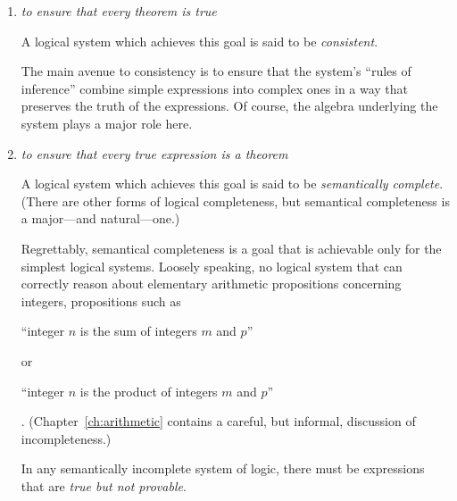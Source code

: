 \begin{enumerate}
\item
{\em to ensure that every theorem is true}

\smallskip


A logical system which achieves this goal is said to be {\it consistent}. 

\smallskip 

The main avenue to consistency is to ensure that the system's ``rules of inference'' combine simple expressions into complex ones in a way that preserves the truth of the expressions.  Of course, the algebra underlying the system plays a major role here.

\medskip\item
{\em to ensure that every true expression is a theorem}

\smallskip


A logical system which achieves this goal is said to be {\it semantically complete}.  (There are other forms of logical completeness, but semantical completeness is a major---and natural---one.)

\smallskip

Regrettably, semantical completeness is a goal that is achievable only for the simplest logical systems.  Loosely speaking, no logical system that can correctly reason about elementary arithmetic propositions concerning integers, propositions such as

\smallskip

\hspace*{.25in}
``integer $n$ is the sum of integers $m$ and $p$''

\noindent or

\hspace*{.25in}
 ``integer $n$ is the product of integers $m$ and $p$''

\smallskip

.  (Chapter~\ref{ch:arithmetic} contains a careful, but informal, discussion of incompleteness.)

\smallskip

In any semantically incomplete system of logic, there must be expressions that are {\em true but not provable}.
\end{enumerate}

\medskip

